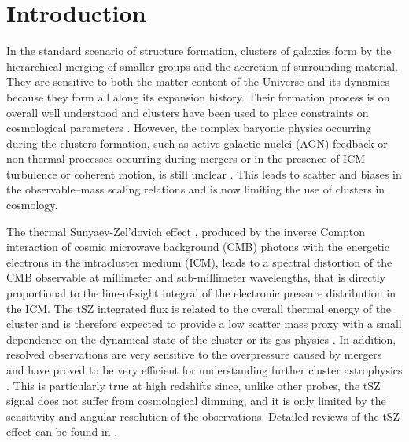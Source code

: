 \documentclass[twocolumn,traditabstract]{aa}
\begin{document}
\maketitle

\section{Introduction}\label{sec:Introduction}
In the standard scenario of structure formation, clusters of galaxies form by the hierarchical merging of smaller groups and the accretion of surrounding material. They are sensitive to both the matter content of the Universe and its dynamics because they form all along its expansion history. Their formation process is on overall well understood and clusters have been used to place constraints on cosmological parameters \citep[e.g.][]{planck2013cluster_count}. However, the complex baryonic physics occurring during the clusters formation, such as active galactic nuclei (AGN) feedback or non-thermal processes occurring during mergers or in the presence of ICM turbulence or coherent motion, is still unclear \citep[see for example][]{borgani2011}. This leads to scatter and biases in the observable--mass scaling relations and is now limiting the use of clusters in cosmology.

The thermal Sunyaev-Zel'dovich effect \citep[tSZ,][]{sunyaev1972,sunyaev1980}, produced by the inverse Compton interaction of cosmic microwave background (CMB) photons with the energetic electrons in the intracluster medium (ICM), leads to a spectral distortion of the CMB observable at millimeter and sub-millimeter wavelengths, that is directly proportional to the line-of-sight integral of the electronic pressure distribution in the ICM. The tSZ integrated flux is related to the overall thermal energy of the cluster and is therefore expected to provide a low scatter mass proxy with a small dependence on the dynamical state of the cluster or its gas physics \citep[e.g.][]{dasilva2004,motl2005,nagai2006}. In addition, resolved observations are very sensitive to the overpressure caused by mergers and have proved to be very efficient for understanding further cluster astrophysics \citep[see for example results by][]{pointecouteau1999,komatsu2001,korngut2011,adam2013,young2014,adam2014,mroczkowski2015}. This is particularly true at high redshifts since, unlike other probes, the tSZ signal does not suffer from cosmological dimming, and it is only limited by the sensitivity and angular resolution of the observations. Detailed reviews of the tSZ effect can be found in \cite{birkinshaw1999,carlstrom2002,kitayama2014}.
\end{document}
